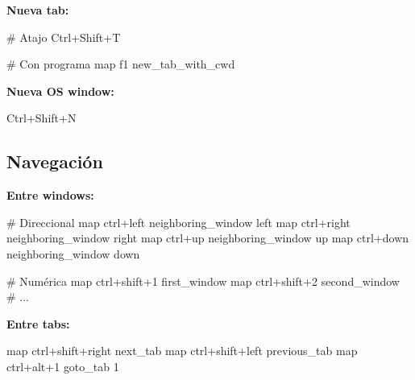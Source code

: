 \documentclass[
  doc,
  floatsintext,
  longtable,
  a4paper,
  nolmodern,
  notxfonts,
  notimes,
  12pt,
  colorlinks=true,linkcolor=blue,citecolor=blue,urlcolor=blue]{apa7}
\newenvironment{Shaded}{\begin{snugshade}}{\end{snugshade}}
\newcommand{\CommentTok}[1]{\textcolor[rgb]{0.37,0.37,0.37}{#1}}
\newcommand{\DataTypeTok}[1]{\textcolor[rgb]{0.68,0.00,0.00}{#1}}
\newcommand{\ErrorTok}[1]{\textcolor[rgb]{0.68,0.00,0.00}{#1}}
\newcommand{\ExtensionTok}[1]{\textcolor[rgb]{0.00,0.23,0.31}{#1}}
\newcommand{\NormalTok}[1]{\textcolor[rgb]{0.00,0.23,0.31}{#1}}
\begin{document}
\textbf{Nueva tab:}

\begin{Shaded}
\begin{Highlighting}[]
\CommentTok{\# Atajo}
\ExtensionTok{Ctrl+Shift+T}

\CommentTok{\# Con programa}
\ExtensionTok{map}\NormalTok{ f1 new\_tab\_with\_cwd}
\end{Highlighting}
\end{Shaded}

\textbf{Nueva OS window:}

\begin{Shaded}
\begin{Highlighting}[]
\ExtensionTok{Ctrl+Shift+N}
\end{Highlighting}
\end{Shaded}

\subsection{Navegación}\label{navegaciuxf3n}

\textbf{Entre windows:}

\begin{Shaded}
\begin{Highlighting}[]
\CommentTok{\# Direccional}
\DataTypeTok{map} \DataTypeTok{ctrl}\ErrorTok{+}\DataTypeTok{left} \DataTypeTok{neighboring\_window} \DataTypeTok{left}
\DataTypeTok{map} \DataTypeTok{ctrl}\ErrorTok{+}\DataTypeTok{right} \DataTypeTok{neighboring\_window} \DataTypeTok{right}
\DataTypeTok{map} \DataTypeTok{ctrl}\ErrorTok{+}\DataTypeTok{up} \DataTypeTok{neighboring\_window} \DataTypeTok{up}
\DataTypeTok{map} \DataTypeTok{ctrl}\ErrorTok{+}\DataTypeTok{down} \DataTypeTok{neighboring\_window} \DataTypeTok{down}

\CommentTok{\# Numérica}
\DataTypeTok{map} \DataTypeTok{ctrl}\ErrorTok{+}\DataTypeTok{shift}\ErrorTok{+}\DataTypeTok{1} \DataTypeTok{first\_window}
\DataTypeTok{map} \DataTypeTok{ctrl}\ErrorTok{+}\DataTypeTok{shift}\ErrorTok{+}\DataTypeTok{2} \DataTypeTok{second\_window}
\CommentTok{\# ...}
\end{Highlighting}
\end{Shaded}

\textbf{Entre tabs:}

\begin{Shaded}
\begin{Highlighting}[]
\DataTypeTok{map} \DataTypeTok{ctrl}\ErrorTok{+}\DataTypeTok{shift}\ErrorTok{+}\DataTypeTok{right} \DataTypeTok{next\_tab}
\DataTypeTok{map} \DataTypeTok{ctrl}\ErrorTok{+}\DataTypeTok{shift}\ErrorTok{+}\DataTypeTok{left} \DataTypeTok{previous\_tab}
\DataTypeTok{map} \DataTypeTok{ctrl}\ErrorTok{+}\DataTypeTok{alt}\ErrorTok{+}\DataTypeTok{1} \DataTypeTok{goto\_tab} \DataTypeTok{1}
\end{Highlighting}
\end{Shaded}
\end{document}
